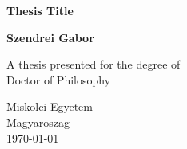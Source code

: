 \documentclass{book}
\begin{document}

\begin{titlepage}
   \begin{center}
       \vspace*{1cm}

       \textbf{Thesis Title}


       \vspace{1.5cm}

       \textbf{Szendrei Gabor}

       \vfill
            
       A thesis presented for the degree of\\
       Doctor of Philosophy
            
       \vspace{0.8cm}
     
            
       
       Miskolci Egyetem\\
       Magyaroszag\\
       \today
            
   \end{center}
\end{titlepage}
\end{document}
